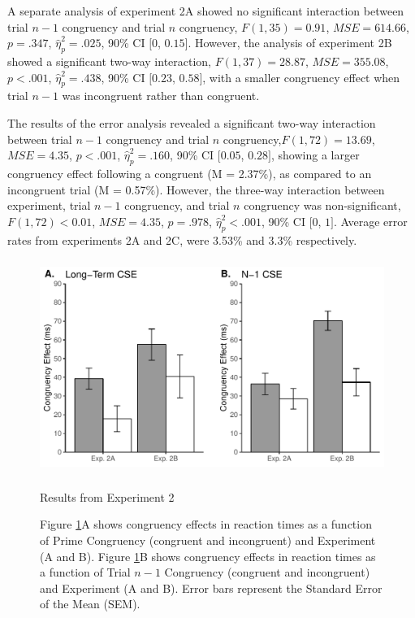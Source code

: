 \documentclass[]{DissertateCUNY}
\begin{document}
A separate analysis of experiment 2A showed no significant interaction
between trial \(n-1\) congruency and trial \(n\) congruency,
\(F(1, 35) = 0.91\), \(\mathit{MSE} = 614.66\), \(p = .347\),
\(\hat{\eta}^2_p = .025\), 90\% CI \([0\), \(0.15]\). However, the
analysis of experiment 2B showed a significant two-way interaction,
\(F(1, 37) = 28.87\), \(\mathit{MSE} = 355.08\), \(p < .001\),
\(\hat{\eta}^2_p = .438\), 90\% CI \([0.23\), \(0.58]\), with a smaller
congruency effect when trial \(n-1\) was incongruent rather than
congruent.

The results of the error analysis revealed a significant two-way
interaction between trial \(n-1\) congruency and trial \(n\)
congruency,\(F(1, 72) = 13.69\), \(\mathit{MSE} = 4.35\), \(p < .001\),
\(\hat{\eta}^2_p = .160\), 90\% CI \([0.05\), \(0.28]\), showing a
larger congruency effect following a congruent (M = 2.37\%), as compared
to an incongruent trial (M = 0.57\%). However, the three-way interaction
between experiment, trial \(n-1\) congruency, and trial \(n\) congruency
was non-significant, \(F(1, 72) < 0.01\), \(\mathit{MSE} = 4.35\),
\(p = .978\), \(\hat{\eta}^2_p < .001\), 90\% CI \([0\), \(1]\). Average
error rates from experiments 2A and 2C, were 3.53\% and 3.3\%
respectively.

\begin{figure}
  \centering
  \includegraphics[height=2.75in]{figures/MGfigure3.pdf}
  \caption{Results from Experiment 2}
  \caption*{Figure \ref{MG_figure3}A shows congruency effects in reaction times as a function of Prime Congruency (congruent and incongruent) and Experiment (A and B). Figure \ref{MG_figure3}B shows congruency effects in reaction times as a function of Trial $n-1$ Congruency (congruent and incongruent) and Experiment (A and B). Error bars represent the Standard Error of the Mean (SEM).}

  \label{MG_figure3}
\end{figure}
\end{document}
